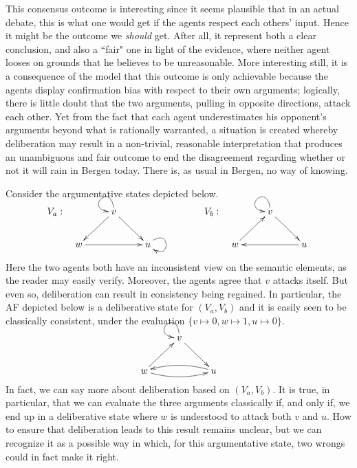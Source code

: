 \documentclass[greybox]{svmult}
\begin{document}
\begin{example}
This consensus outcome is interesting since it seems plausible that in an actual debate, this is what one would get if the agents respect each others' input. Hence it might be the outcome we \emph{should} get. After all, it represent both a clear conclusion, and also a ``fair" one in light of the evidence, where neither agent looses on grounds that he believes to be unreasonable. More interesting still, it is a consequence of the model that this outcome is only achievable because the agents display confirmation bias with respect to their own arguments; logically, there is little doubt that the two arguments, pulling in opposite directions, attack each other. Yet from the fact that each agent underestimates his opponent's arguments beyond what is rationally warranted, a situation is created whereby deliberation may result in a non-trivial, reasonable interpretation that produces an unambiguous and fair outcome to end the disagreement regarding whether or not it will rain in Bergen today. There is, as usual in Bergen, no way of knowing.

\end{example}

\begin{example}\label{ex:wr}
Consider the argumentative states depicted below. $$
\begin{array}{llll}
V_a: & \xymatrix{ & v \ar[dr] \ar[dl] \ar@(u,l) \\ w \ar[rr] && u \ar@(ru,rd) } & \hspace{1.5cm} V_b: & \xymatrix{ & v \ar@(u,l) \ar[dr] \\ w \ar[ur]  && u \ar[ll] }
\end{array}
$$

Here the two agents both have an inconsistent view on the semantic elements, as the reader may easily verify. Moreover, the agents agree that $v$ attacks itself. But even so, deliberation can result in consistency being regained. In particular, the AF depicted below is a deliberative state for $(V_a,V_b)$ and it is easily seen to be classically consistent, under the evaluation $\{v \mapsto 0, w \mapsto 1, u \mapsto 0\}$.
$$
\xymatrix{ &  v \ar@(u,l) \ar[dr] \\ w \ar[ur] \ar@/_/[rr] && u \ar@/_/[ll] }
$$
In fact, we can say more about deliberation based on $(V_a,V_b)$. It is true, in particular, that we can evaluate the three arguments classically if, and only if, we end up in a deliberative state where $w$ is understood to attack both $v$ and $u$. How to ensure that deliberation leads to this result remains unclear, but we can recognize it as a possible way in which, for this argumentative state, two wrongs could in fact make it right.

\end{example}
\end{document}
